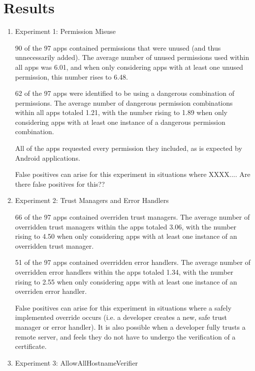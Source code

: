 \section{Results}
\label{sec:discussion}

\begin{enumerate}
    \item Experiment 1: Permission Misuse
    
    90 of the 97 apps contained permissions that were 
    unused (and thus unnecessarily added). The average number 
    of unused permissions used within all apps was 6.01, 
    and when only considering apps with at least one 
    unused permission, this number rises to 6.48.

    62 of the 97 apps were identified to be using a dangerous
    combination of permissions. The average number of dangerous permission
    combinations within all apps totaled 1.21, with the number
    rising to 1.89 when only considering apps with at least one
    instance of a dangerous permission combination.

    All of the apps requested every permission they included, as is expected by Android applications. 

    False positives can arise for this experiment in situations where XXXX....
    Are there false positives for this??

    \item Experiment 2: Trust Managers and Error Handlers
    
    66 of the 97 apps contained overriden trust managers.
    The average number of overridden trust managers within the 
    apps totaled 3.06, with the number rising to 4.50 when only 
    considering apps with at least one instance of an overridden trust 
    manager.

    51 of the 97 apps contained overridden error handlers.
    The average number of overridden error handlers within the apps
    totaled 1.34, with the number rising to 2.55 when only considering apps
    with at least one instance of an overriden error handler.

    False positives can arise for this experiment in situations where a safely implemented override occurs (i.e. a developer creates a new, safe trust manager or error handler). It is also possible when a developer fully trusts a remote server, and feels they do not have to undergo the verification of a certificate.

    \item Experiment 3: AllowAllHostnameVerifier
    

\end{enumerate}
